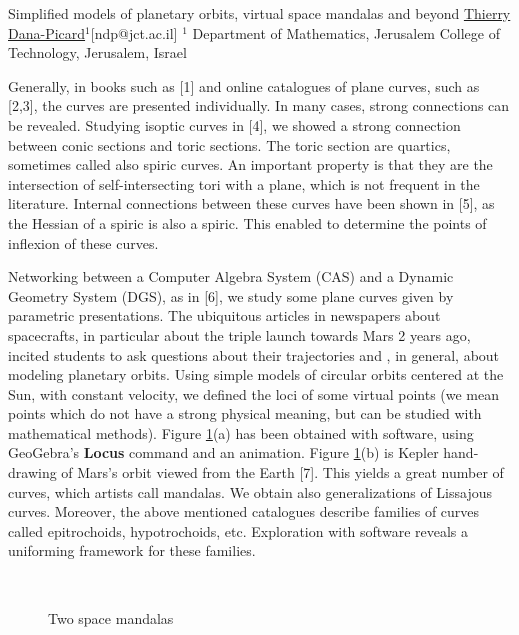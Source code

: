 


\begin{abstract_online}{Simplified models of planetary orbits, virtual space mandalas and beyond}{%
        \underline{Thierry Dana-Picard}$^{1}$}{[ndp@jct.ac.il]
        }{%
        $^1$ Department of Mathematics, Jerusalem College of Technology, Jerusalem, Israel}

Generally, in books such as [1] and online catalogues of plane curves, such as [2,3], the curves are presented individually. In many cases, strong connections can be revealed.
Studying isoptic curves in [4], we showed a strong connection between conic sections and toric sections. The toric section are quartics, sometimes called also spiric curves. An important property is that they are the intersection of self-intersecting tori with a plane, which is not frequent in the literature. Internal connections between these curves have been shown in [5], as the Hessian of a spiric is also a spiric. This enabled to determine the points of inflexion of these curves.

Networking between a Computer Algebra System (CAS) and a Dynamic Geometry System (DGS), as in [6], we study some plane curves given by parametric presentations. The ubiquitous articles in newspapers about spacecrafts, in particular about the triple launch towards Mars 2 years ago, incited students to ask questions about their trajectories and , in general, about modeling planetary orbits. Using simple models of circular orbits centered at the Sun, with constant velocity, we defined the loci of some virtual points (we mean points which do not have a strong physical meaning, but can be studied with mathematical methods). Figure \ref{fig mandalas}(a) has been obtained with software, using GeoGebra's \textbf{Locus} command and an animation. Figure \ref{fig mandalas}(b) is Kepler hand-drawing of Mars's orbit viewed from the Earth [7]. This yields a great number of curves, which artists call mandalas. We obtain also generalizations of Lissajous curves. Moreover, the above mentioned catalogues describe families of curves called epitrochoids, hypotrochoids, etc. Exploration with software reveals a uniforming framework for these families.

\begin{figure}[htb]
\centering
\mbox{
       \quad
       }
\caption{Two space mandalas}
\label{fig mandalas}
\end{figure}


\end{abstract_online}
